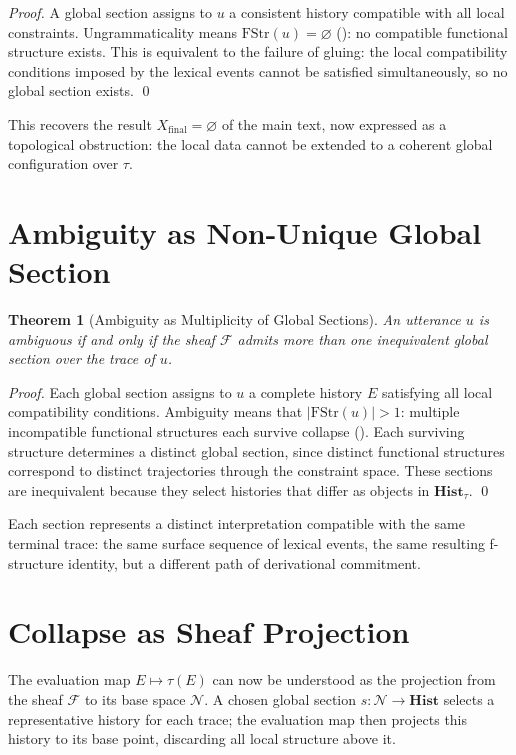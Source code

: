 \documentclass[12pt, oneside]{amsbook}
\theoremstyle{plain}
\newtheorem{theorem}{Theorem}[section]
\theoremstyle{definition}
\theoremstyle{remark}
\newcommand{\NF}{\mathcal{N}}
\newcommand{\trace}{\tau}
\newcommand{\FStr}{\mathrm{FStr}}
\begin{document}
\begin{proof}
A global section assigns to $u$ a consistent history compatible with all
local constraints. Ungrammaticality means $\FStr(u) = \varnothing$
(): no compatible functional structure exists.
This is equivalent to the failure of gluing: the local compatibility
conditions imposed by the lexical events cannot be satisfied simultaneously,
so no global section exists. \qed
\end{proof}

This recovers the result $X_{\mathrm{final}} = \varnothing$ of the main text,
now expressed as a topological obstruction: the local data cannot be extended
to a coherent global configuration over $\tau$.

\section{Ambiguity as Non-Unique Global Section}

\begin{theorem}[Ambiguity as Multiplicity of Global Sections]
\label{thm:ambiguity-section}
An utterance $u$ is ambiguous if and only if the sheaf $\mathcal{F}$ admits
more than one inequivalent global section over the trace of $u$.
\end{theorem}

\begin{proof}
Each global section assigns to $u$ a complete history $E$ satisfying all
local compatibility conditions. Ambiguity means that $|\FStr(u)| > 1$:
multiple incompatible functional structures each survive collapse
(). Each surviving structure determines a distinct
global section, since distinct functional structures correspond to distinct
trajectories through the constraint space. These sections are inequivalent
because they select histories that differ as objects in $\mathbf{Hist}_\tau$.
\qed
\end{proof}

Each section represents a distinct interpretation compatible with the same
terminal trace: the same surface sequence of lexical events, the same
resulting f-structure identity, but a different path of derivational
commitment.

\section{Collapse as Sheaf Projection}

The evaluation map $E \mapsto \trace(E)$ can now be understood as the
projection from the sheaf $\mathcal{F}$ to its base space $\NF$. A chosen
global section $s : \NF \to \mathbf{Hist}$ selects a representative history
for each trace; the evaluation map then projects this history to its base
point, discarding all local structure above it.
\end{document}
